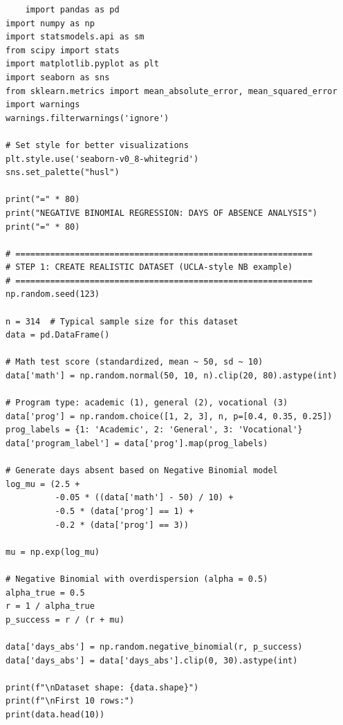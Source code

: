\documentclass[12pt]{article}
\begin{document}
\begin{verbatim}
    import pandas as pd
import numpy as np
import statsmodels.api as sm
from scipy import stats
import matplotlib.pyplot as plt
import seaborn as sns
from sklearn.metrics import mean_absolute_error, mean_squared_error
import warnings
warnings.filterwarnings('ignore')

# Set style for better visualizations
plt.style.use('seaborn-v0_8-whitegrid')
sns.set_palette("husl")

print("=" * 80)
print("NEGATIVE BINOMIAL REGRESSION: DAYS OF ABSENCE ANALYSIS")
print("=" * 80)

# ============================================================
# STEP 1: CREATE REALISTIC DATASET (UCLA-style NB example)
# ============================================================
np.random.seed(123)

n = 314  # Typical sample size for this dataset
data = pd.DataFrame()

# Math test score (standardized, mean ~ 50, sd ~ 10)
data['math'] = np.random.normal(50, 10, n).clip(20, 80).astype(int)

# Program type: academic (1), general (2), vocational (3)
data['prog'] = np.random.choice([1, 2, 3], n, p=[0.4, 0.35, 0.25])
prog_labels = {1: 'Academic', 2: 'General', 3: 'Vocational'}
data['program_label'] = data['prog'].map(prog_labels)

# Generate days absent based on Negative Binomial model
log_mu = (2.5 + 
          -0.05 * ((data['math'] - 50) / 10) +
          -0.5 * (data['prog'] == 1) +
          -0.2 * (data['prog'] == 3))

mu = np.exp(log_mu)

# Negative Binomial with overdispersion (alpha = 0.5)
alpha_true = 0.5
r = 1 / alpha_true
p_success = r / (r + mu)

data['days_abs'] = np.random.negative_binomial(r, p_success)
data['days_abs'] = data['days_abs'].clip(0, 30).astype(int)

print(f"\nDataset shape: {data.shape}")
print(f"\nFirst 10 rows:")
print(data.head(10))
\end{verbatim}
\vspace{0.1cm}
\end{document}
